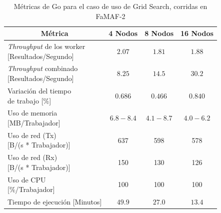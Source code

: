 \documentclass[11pt]{article}
\providecommand{\row}[1]{\parbox{150pt}{\setlength{\baselineskip}{0.2\baselineskip}\strut#1\strut}}
\newcommand{\gscap}[2]{\caption{Métricas de #1 para el caso de uso de Grid Search, corridas en #2}}
\newcommand{\english}[1]{\textit{#1}}
\begin{document}
\begin{table}[H]
\centering
\begin{tabular}{|l|c|c|c|}
\hline
\multicolumn{1}{|c|}{Métrica} & 4 Nodos & 8 Nodos & 16 Nodos \\ \hline
\row{\english{Throughput} de los worker\\{[Resultados/Segundo]}} & $2.07$ & $1.81$ & $1.88$ \\ \hline
\row{\english{Throughput} combinado\\{[Resultados/Segundo]}} & $8.25$ & $14.5$ & $30.2$ \\ \hline
\row{Variación del tiempo\\de trabajo {[\%]}} & $0.686$ & $0.466$ & $0.840$ \\ \hline
\row{Uso de memoria\\{[MB/Trabajador]}} & $6.8-8.4$ & $4.1-8.7$ & $4.0-6.2$ \\ \hline
\row{Uso de red (Tx)\\{[B/(s * Trabajador)]}} & 637 & 598 & 578 \\ \hline
\row{Uso de red (Rx)\\{[B/(s * Trabajador)]}} & 150 & 130 & 126 \\ \hline
\row{Uso de CPU\\{[\%/Trabajador]}} & 100 & 100 & 100 \\ \hline
Tiempo de ejecución [Minutos] & $49.9$ & $27.0$ & $13.4$ \\ \hline
\end{tabular}
\gscap{Go}{FaMAF-2}
\end{table}
\end{document}
